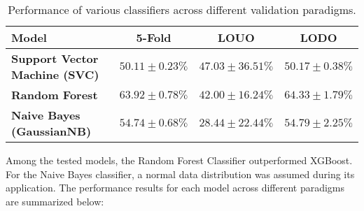 \documentclass{article}
\begin{document}
\begin{table}[h!]
\centering
\begin{tabular}{|l|c|c|c|}
\hline
\textbf{Model}               & \textbf{5-Fold}             & \textbf{LOUO}               & \textbf{LODO}               \\ \hline
\textbf{Support Vector Machine (SVC)} & $50.11 \pm 0.23\%$  & $47.03 \pm 36.51\%$ & $50.17 \pm 0.38\%$  \\ \hline
\textbf{Random Forest}       & $63.92 \pm 0.78\%$  & $42.00 \pm 16.24\%$ & $64.33 \pm 1.79\%$  \\ \hline
\textbf{Naive Bayes (GaussianNB)} & $54.74 \pm 0.68\%$  & $28.44 \pm 22.44\%$ & $54.79 \pm 2.25\%$  \\ \hline
\end{tabular}
\caption{Performance of various classifiers across different validation paradigms.}
\label{tab:exercise2}
\end{table}

Among the tested models, the Random Forest Classifier outperformed XGBoost. For the Naive Bayes classifier, a normal data distribution was assumed during its application. The performance results for each model across different paradigms are summarized below:
\end{document}
